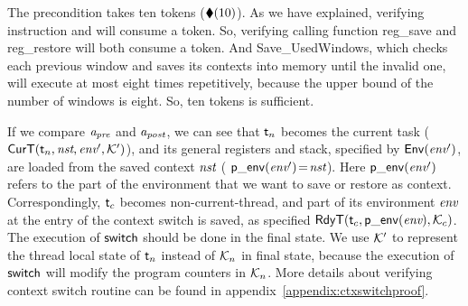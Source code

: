The precondition takes ten tokens ($\blacklozenge({10})$). 
As we have explained, verifying instruction \call{} 
and \jmp{} will consume a token. 
So, verifying calling function
\textsf{reg\_save} and \textsf{reg\_restore} will 
both consume a token. And \textsf{Save\_UsedWindows}, 
which checks each previous window 
and saves its contexts into memory until the invalid one, 
will execute at most eight times repetitively, 
because the upper bound of 
the number of windows is eight. 
So, ten tokens is sufficient. 

If we compare $\textit{a}_\textit{pre}$ and $\textit{a}_\textit{post}$, we can see that
$\textsf{t}_n$ becomes the current task
($\textsf{CurT}({\textsf{t}_n}, {\textit{nst}}, {\textit{env}'}, {\mathcal{K}'})$),
and its general registers and stack, specified by
$\mathsf{Env}({\textit{env}'})$, are loaded from the saved context
$\textit{nst}$ (\ie{} $\mathsf{p\_env}({\textit{env}'})\!=\!\textit{nst}$).
Here $\mathsf{p\_env}({\textit{env}'})$ refers to the part of the environment
that we want to save or restore as context.
Correspondingly, $\textsf{t}_c$ becomes non-current-thread,
and part of its environment $\textit{env}$ at the entry of
the context switch is saved, as specified
$\textsf{RdyT}({\textsf{t}_c}, {\mathsf{p\_env}({\textit{env}})}, {\mathcal{K}_c})$. 
The execution of $\mathsf{switch}$ should be done in the final state. 
We use $\mathcal{K}'$ to represent the thread local 
state of $\textsf{t}_n$ instead of $\mathcal{K}_n$ in final state, 
because the execution of $\mathsf{switch}$ will modify the program counters 
in $\mathcal{K}_n$. More details about verifying 
context switch routine can be found in 
appendix~\ref{appendix:ctxswitchproof}. 